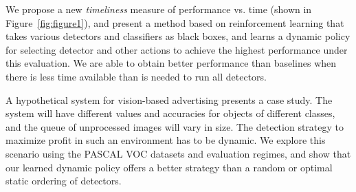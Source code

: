 We propose a new \emph{timeliness} measure of performance vs. time (shown in Figure~\ref{fig:figure1}), and present a method based on reinforcement learning that takes various detectors and classifiers as black boxes, and learns a dynamic policy for selecting detector and other actions to achieve the highest performance under this evaluation.
We are able to obtain better performance than baselines when there is less time available than is needed to run all detectors.

A hypothetical system for vision-based advertising presents a case study.
The system will have different values and accuracies for objects of different classes, and the queue of unprocessed images will vary in size.
The detection strategy to maximize profit in such an environment has to be dynamic.
We explore this scenario using the PASCAL VOC datasets and evaluation regimes, and show that our learned dynamic policy offers a better strategy than a random or optimal static ordering of detectors.
